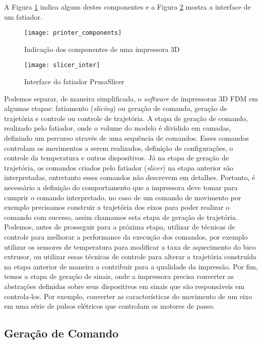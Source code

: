 A Figura \ref{fig:impressora3d_comp} indica alguns destes componentes e a Figura \ref{fig:slicer_inter} mostra a interface de um fatiador.

\begin{figure}[H]
    \centering
    \caption{Indicação dos componentes de uma impressora 3D}
    \texttt{[image: printer\_components]}
    \label{fig:impressora3d_comp}
\end{figure}

\begin{figure}[H]
    \centering
    \caption{Interface do fatiador PrusaSlicer}
    \texttt{[image: slicer\_inter]}
    \label{fig:slicer_inter}
\end{figure}

Podemos separar, de maneira simplificada, o \textit{software} de impressoras 3D FDM em algumas etapas: fatiamento (\textit{slicing}) ou geração de comando, geração de trajetória e controle ou controle de trajetória. A etapa de geração de comando, realizado pelo fatiador, onde o volume do modelo é dividido em camadas, definindo um percurso através de uma sequência de comandos. Esses comandos controlam os movimentos a serem realizados, definição de configurações, o controle da temperatura e outros dispositivos. Já na etapa de geração de trajetória, os comandos criados pelo fatiador (\textit{slicer}) na etapa anterior são interpretadas, entretanto esses comandos não descrevem em detalhes. Portanto, é necessário a definição do comportamento que a impressora deve tomar para cumprir o comando interpretado, no caso de um comando de movimento por exemplo precisamos construir a trajetória dos eixos para poder realizar o comando com sucesso, assim chamamos esta etapa de geração de trajetória. Podemos, antes de prosseguir para a próxima etapa, utilizar de técnicas de controle para melhorar a performance da execução dos comandos, por exemplo utilizar os sensores de temperatura para modificar a taxa de aquecimento do bico extrusor, ou utilizar essas técnicas de controle para alterar a trajetória construída na etapa anterior de maneira a contribuir para a qualidade da impressão. Por fim, temos a etapa de geração de sinais, onde a impressora precisa converter as abstrações definidas sobre seus dispositivos em sinais que são responsáveis em controla-los. Por exemplo, converter as características do movimento de um eixo em uma série de pulsos elétricos que controlam os motores de passo. 

\subsection{Geração de Comando}

